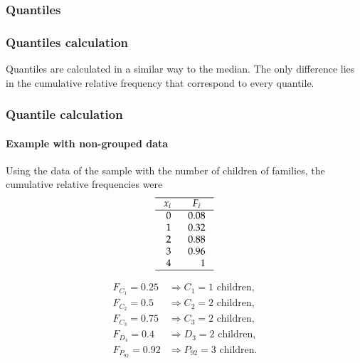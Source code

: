 \begin{frame}
\frametitle{Quantiles}
\begin{center}
\scalebox{0.8}{}
\end{center}
\end{frame}


\begin{frame}
\frametitle{Quantiles calculation}
Quantiles are calculated in a similar way to the median. 
The only difference lies in the cumulative relative frequency that correspond to every quantile.  
\begin{center}
\scalebox{0.6}{}
\end{center}
\end{frame}


\begin{frame}
\frametitle{Quantile calculation}
\framesubtitle{Example with non-grouped data}
Using the data of the sample with the number of children of families, the cumulative relative frequencies were
\[
\setlength\arraycolsep{3mm}
\setlength\arrayrulewidth{0.5pt}
\begin{array}{rr}
\hline
\multicolumn{1}{c}{x_i} & \multicolumn{1}{c}{F_i} \\
\hline
0 & 0.08\\
1 & 0.32\\
2 & 0.88\\
3 & 0.96\\
4 & 1\\
\hline
\end{array}
\]

\begin{align*}
F_{C_1}=0.25 &\Rightarrow C_1 = 1 \text{ children},\\
F_{C_2}=0.5 &\Rightarrow C_2 = 2 \text{ children},\\
F_{C_3}=0.75 &\Rightarrow C_3 = 2 \text{ children},\\
F_{D_4}=0.4 &\Rightarrow D_3 = 2 \text{ children},\\
F_{P_{92}}=0.92 &\Rightarrow P_{92} = 3 \text{ children}.\\
\end{align*}
\end{frame}


